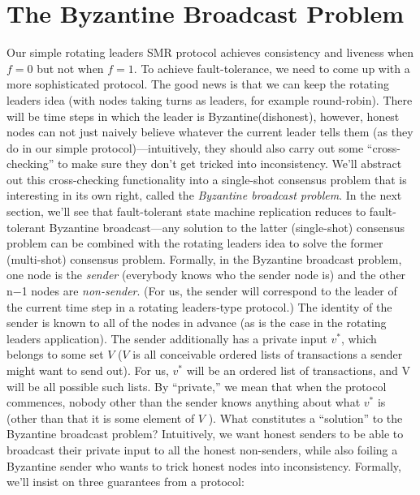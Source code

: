 \section{The Byzantine Broadcast Problem}
Our simple rotating leaders SMR protocol achieves consistency and liveness when $f = 0$ but
not when $f = 1$. To achieve fault-tolerance, we need to come up with a more sophisticated
protocol. The good news is that we can keep the rotating leaders idea (with nodes
taking turns as leaders, for example round-robin). There will be time steps in which the
leader is Byzantine(dishonest), however, honest nodes can not just naively believe whatever the
current leader tells them (as they do in our simple protocol)—intuitively, they should also
carry out some “cross-checking” to make sure they don’t get tricked into inconsistency. We’ll
abstract out this cross-checking functionality into a single-shot consensus problem that is
interesting in its own right, called the \textit{Byzantine broadcast problem}. In the next section,
we’ll see that fault-tolerant state machine replication reduces to fault-tolerant Byzantine
broadcast—any solution to the latter (single-shot) consensus problem can be combined with
the rotating leaders idea to solve the former (multi-shot) consensus problem.
Formally, in the Byzantine broadcast problem, one node is the \textit{sender} (everybody knows who the sender node is) and the other n−1
nodes are \textit{non-sender}. (For us, the sender will correspond to the leader of the current time
step in a rotating leaders-type protocol.) The identity of the sender is known to all of the
nodes in advance (as is the case in the rotating leaders application). The sender additionally
has a private input $v^*$, which belongs to some set $V$ ($V$ is all conceivable ordered lists of transactions a sender might want to send out).
For us, $v^*$ will be an ordered list of
transactions, and V will be all possible such lists. By “private,” we mean that when the
protocol commences, nobody other than the sender knows anything about what $v^*$ is (other
than that it is some element of $V$ ).
What constitutes a “solution” to the Byzantine broadcast problem? Intuitively, we want
honest senders to be able to broadcast their private input to all the honest non-senders,
while also foiling a Byzantine sender who wants to trick honest nodes into inconsistency.
Formally, we’ll insist on three guarantees from a protocol:\\


